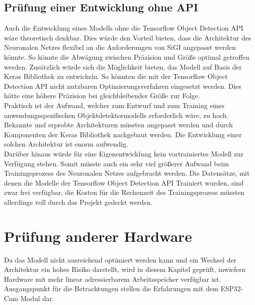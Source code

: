 \subsection{Prüfung einer Entwicklung ohne API}
    Auch die Entwicklung eines Modells ohne die Tensorflow Object Detection API wäre theoretisch denkbar. Dies würde den Vorteil bieten, dass die Architektur des Neuronalen Netzes flexibel an die Anforderungen von SiGI angepasst werden könnte. So könnte die Abwägung zwischen Präzision und Größe optimal getroffen werden. Zusätzlich würde sich die Möglichkeit bieten, das Modell auf Basis der Keras Bibliothek zu entwickeln. So könnten die mit der Tensorflow Object Detection API nicht nutzbaren Optimierungsverfahren eingesetzt werden. Dies hätte eine höhere Präzision bei gleichbleibender Größe zur Folge.\\ Praktisch ist der Aufwand, welcher zum Entwurf und zum Training eines anwendungsspezifischen Objektdetektormodells erforderlich wäre, zu hoch. Bekannte und erprobte Architekturen müssten angepasst werden und durch Komponenten der Keras Bibliothek nachgebaut werden. Die Entwicklung einer solchen Architektur ist enorm aufwendig.\\ Darüber hinaus würde für eine Eigenentwicklung kein vortrainiertes Modell zur Verfügung stehen. Somit müsste auch ein sehr viel größerer Aufwand beim Trainingsprozess des Neuronalen Netzes aufgebracht werden. Die Datensätze, mit denen die Modelle der Tensorflow Object Detection API Trainiert wurden, sind zwar frei verfügbar, die Kosten für die Rechenzeit des Trainingsprozess müssten allerdings voll durch das Projekt gedeckt werden.

\section{Prüfung anderer Hardware}
    Da das Modell nicht ausreichend optimiert werden kann und ein Wechsel der Architektur ein hohes Risiko darstellt, wird in diesem Kapitel geprüft, inwiefern Hardware mit mehr linear adressierbarem Arbeitsspeicher verfügbar ist. Ausgangspunkt für die Betrachtungen stellen die Erfahrungen mit dem ESP32-Cam Modul dar.

